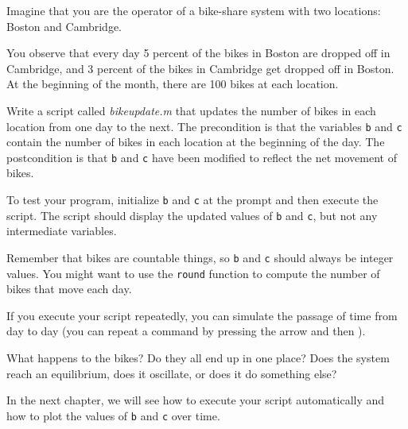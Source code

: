\begin{ex}
\label{bikegame}

Imagine that you are the operator of a bike-share system with two
locations: Boston and Cambridge.

You observe that every day 5 percent
of the bikes in Boston are dropped off in Cambridge, and 3 percent of the bikes
in Cambridge get dropped off in Boston.
At the beginning of the month, there are 100 bikes at each location.

Write a script called \emph{bike\textunderscore update.m} that updates the number
of bikes in each location from one day to the next.  The precondition
is that the variables \lstinline{b} and \lstinline{c} contain the number of bikes
in each location at the beginning of the day.  The postcondition
is that \lstinline{b} and \lstinline{c} have been modified to reflect the net movement of bikes.

To test your program, initialize \lstinline{b} and \lstinline{c} at
the prompt and then execute the script.  The script should display
the updated values of \lstinline{b} and \lstinline{c}, but not any intermediate
variables.

Remember that bikes are countable things, so \lstinline{b} and \lstinline{c} should always be integer values.  You might want to use the \lstinline{round} function
to compute the number of bikes that move each day.

If you execute your script repeatedly, you can simulate the passage
of time from day to day (you can repeat a command by pressing the  arrow and then ).

What happens to the bikes?  Do they all end up in one place?  Does the system reach an equilibrium, does it oscillate, or does it do something else?

In the next chapter, we will see how to execute your script automatically
and how to plot the values of \lstinline{b} and \lstinline{c} over time.

\end{ex}
